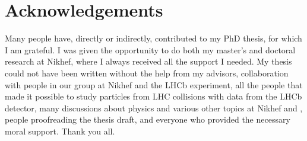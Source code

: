 \chapter*{Acknowledgements}
\thispagestyle{empty}
\chaptermark{}

Many people have, directly or indirectly, contributed to my PhD thesis, for which I am grateful. I was given the opportunity to do both my
master's and doctoral research at Nikhef, where I always received all the support I needed. My thesis could not have been written without
the help from my advisors, collaboration with people in our group at Nikhef and the LHCb experiment, all the people that made it possible
to study particles from LHC collisions with data from the LHCb detector, many discussions about physics and various other topics at Nikhef
and \cern, people proofreading the thesis draft, and everyone who provided the necessary moral support. Thank you all.

\newpage
\thispagestyle{empty}

\cleardoublepage
